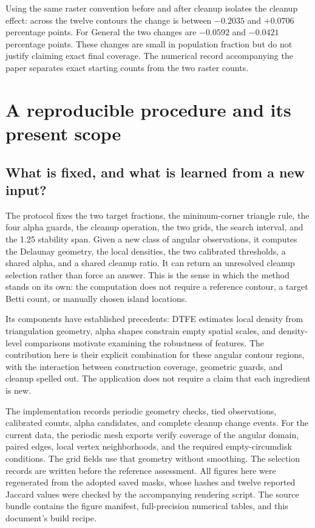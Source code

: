 \documentclass[11pt]{article}
\begin{document}
Using the same raster convention before and after cleanup isolates the
cleanup effect: across the twelve contours the change is between
$-0.2035$ and $+0.0706$ percentage points. For General the two changes are
$-0.0592$ and $-0.0421$ percentage points. These changes are small in
population fraction but do not justify claiming exact final coverage.
The numerical record accompanying the paper separates exact starting
counts from the two raster counts.

\FloatBarrier
\section{A reproducible procedure and its present scope}
\label{sec:scope}

\subsection{What is fixed, and what is learned from a new input?}

The protocol fixes the two target fractions, the minimum-corner triangle
rule, the four alpha guards, the cleanup operation, the two grids, the
search interval, and the 1.25 stability span. Given a new class of angular
observations, it computes the Delaunay geometry, the local densities, the
two calibrated thresholds, a shared alpha, and a shared cleanup ratio.
It can return an unresolved cleanup selection rather than force an answer.
This is the sense in which the method stands on its own: the computation
does not require a reference contour, a target Betti count, or manually
chosen island locations.

Its components have established precedents: DTFE estimates local density
from triangulation geometry, alpha shapes constrain empty spatial scales,
and density-level comparisons motivate examining the robustness of
features. The contribution here is their explicit combination for these
angular contour regions, with the interaction between construction
coverage, geometric guards, and cleanup spelled out. The application does
not require a claim that each ingredient is new.

The implementation records periodic geometry checks, tied observations,
calibrated counts, alpha candidates, and complete cleanup change events.
For the current data, the periodic mesh exports verify coverage of the
angular domain, paired edges, local vertex neighborhoods, and the required
empty-circumdisk conditions. The grid fields use that geometry without
smoothing. The selection records are written before the reference
assessment. All figures here were regenerated from the adopted saved masks,
whose hashes and twelve reported Jaccard values were checked by the
accompanying rendering script. The source bundle contains the figure
manifest, full-precision numerical tables, and this document's build recipe.
\end{document}
